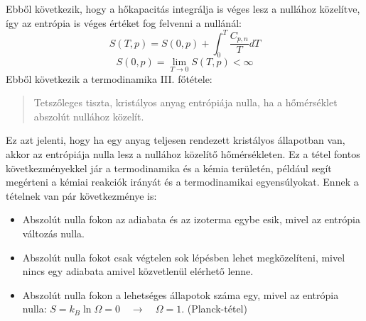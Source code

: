 \documentclass[../main.tex]{subfiles}
\begin{document}
Ebből következik, hogy a hőkapacitás integrálja is véges lesz a nullához közelítve, így az entrópia is véges értéket fog felvenni a nullánál:
\begin{equation}
    S(T, p) = S(0, p) + \int_{0}^{T} \frac{C_{p,n}}{T} dT
\end{equation}
\begin{equation}
    S(0, p) = \lim_{T \to 0} S(T, p) < \infty
\end{equation}
Ebből következik a termodinamika III. főtétele:
\begin{quote}
    Tetszőleges tiszta, kristályos anyag entrópiája nulla, ha a hőmérséklet abszolút nullához közelít.
\end{quote}
Ez azt jelenti, hogy ha egy anyag teljesen rendezett kristályos állapotban van, akkor az entrópiája nulla lesz a nullához közelítő hőmérsékleten.
Ez a tétel fontos következményekkel jár a termodinamika és a kémia területén, például segít megérteni a kémiai reakciók irányát és a termodinamikai egyensúlyokat.
Ennek a tételnek van pár következménye is:
\begin{itemize}
    \item Abszolút nulla fokon az adiabata és az izoterma egybe esik, mivel az entrópia változás nulla.
    \item Abszolút nulla fokot csak végtelen sok lépésben lehet megközelíteni, mivel nincs egy adiabata amivel közvetlenül elérhető lenne.
    \item Abszolút nulla fokon a lehetséges állapotok száma egy, mivel az entrópia nulla: $S = k_B \ln \Omega = 0 \quad \to \quad \Omega = 1$. (Planck-tétel)
\end{itemize}
\end{document}
